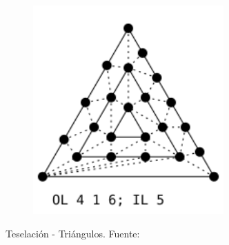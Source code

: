 \begin{figure}
\begin{subfigure}{0.45\textwidth}
	\end{subfigure}
	\hfill
	\begin{subfigure}{0.45\textwidth}
			\includegraphics[height=8cm,width=\textwidth]{figures/TriFull.png}	
	\end{subfigure}
	\caption[Teselación - Triángulos.]{Teselación - Triángulos.
	Fuente:~\cite{TessellationImages}}
	\label{fig:triangletessellation}
\end{figure}

